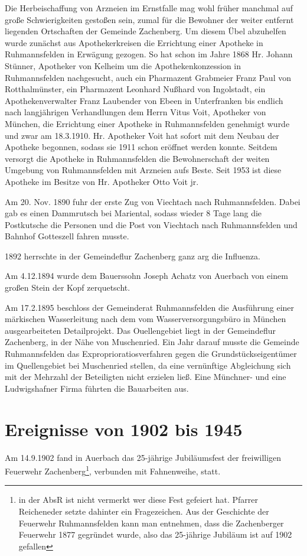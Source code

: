 \documentclass[12pt,a4pager,draft]{book}
\begin{document}
Die Herbeischaffung von Arzneien im Ernstfalle mag wohl früher manchmal auf
große Schwierigkeiten gestoßen sein, zumal für die Bewohner der weiter entfernt
liegenden Ortschaften der Gemeinde Zachenberg. Um diesem Übel abzuhelfen wurde
zunächst aus Apothekerkreisen die Errichtung einer Apotheke in Ruhmannsfelden in
Erwägung gezogen. So hat schon im Jahre 1868 Hr. Johann Stünner, Apotheker von
Kelheim um die Apothekenkonzession in Ruhmannsfelden nachgesucht, auch ein
Pharmazent Grabmeier Franz Paul von Rotthalmünster, ein Pharmazent Leonhard
Nußhard von Ingolstadt, ein Apothekenverwalter Franz Laubender von Ebeen in
Unterfranken bis endlich nach langjährigen Verhandlungen dem Herrn Vitus Voit,
Apotheker von München, die Errichtung einer Apotheke in Ruhmannsfelden genehmigt
wurde und zwar am 18.3.1910. Hr. Apotheker Voit hat sofort mit dem Neubau der
Apotheke begonnen, sodass sie 1911 schon eröffnet werden konnte. Seitdem
versorgt die Apotheke in Ruhmannsfelden die Bewohnerschaft der weiten Umgebung
von Ruhmannsfelden mit Arzneien aufs Beste. Seit 1953 ist diese Apotheke im
Besitze von Hr. Apotheker Otto Voit jr.

Am 20. Nov. 1890 fuhr der erste Zug von Viechtach nach Ruhmannsfelden. Dabei gab
es einen Dammrutsch bei Mariental, sodass wieder 8 Tage lang die Postkutsche die
Personen und die Post von Viechtach nach Ruhmannsfelden und Bahnhof Gotteszell
fahren musste.

1892 herrschte in der Gemeindeflur Zachenberg ganz arg die Influenza.

Am 4.12.1894 wurde dem Bauerssohn Joseph Achatz von Auerbach von einem großen
Stein der Kopf zerquetscht.

Am 17.2.1895 beschloss der Gemeinderat Ruhmannsfelden die Ausführung einer
märkischen Wasserleitung nach dem vom Wasserversorgungsbüro in München
ausgearbeiteten Detailprojekt. Das Ouellengebiet liegt in der Gemeindeflur
Zachenberg, in der Nähe von Muschenried. Ein Jahr darauf musste die Gemeinde
Ruhmannsfelden das Exproprioratiosverfahren gegen die Grundstückseigentümer im
Quellengebiet bei Muschenried stellen, da eine vernünftige Abgleichung sich mit
der Mehrzahl der Beteiligten nicht erzielen ließ. Eine Münchner- und eine
Ludwigshafner Firma führten die Bauarbeiten aus.

\section{Ereignisse von 1902 bis 1945}

Am 14.9.1902 fand in Auerbach das 25-jährige Jubiläumsfest der freiwilligen
Feuerwehr Zachenberg\footnote{in der AbsR ist nicht vermerkt wer diese Fest
gefeiert hat. Pfarrer Reicheneder setzte dahinter ein Fragezeichen. Aus der
Geschichte der Feuerwehr Ruhmannsfelden kann man entnehmen, dass die
Zachenberger Feuerwehr 1877 gegründet wurde, also das 25-jährige Jubiläum ist
auf 1902 gefallen}, verbunden mit Fahnenweihe, statt.
\end{document}
